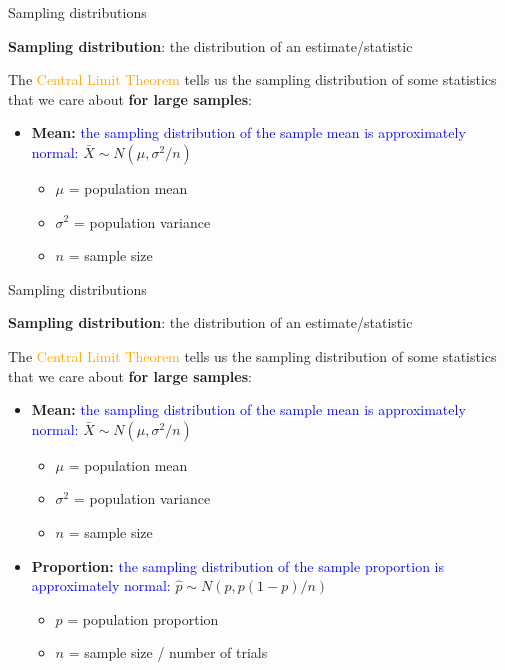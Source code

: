 \documentclass[10pt,t]{beamer}
\begin{document}
\begin{frame}{Sampling distributions}

\textbf{Sampling distribution}: the distribution of an estimate/statistic

\vspace{0.3cm}

The \textcolor{orange}{Central Limit Theorem} tells us the sampling distribution of some statistics that we care about \textbf{for large samples}:
\medskip
\begin{itemize}
		\item \textbf{Mean:} \textcolor{blue}{the sampling distribution of the sample mean is approximately normal:} $\bar{X} \sim N(\mu, \sigma^2 / n)$
	\smallskip
	\begin{itemize}
		\item $\mu$ = population mean
		\smallskip
		\item $\sigma^2$ = population variance
		\smallskip
		\item $n$ = sample size
	\end{itemize}

\end{itemize}
\end{frame}

\begin{frame}{Sampling distributions}

\textbf{Sampling distribution}: the distribution of an estimate/statistic

\vspace{0.3cm}

The \textcolor{orange}{Central Limit Theorem} tells us the sampling distribution of some statistics that we care about \textbf{for large samples}:
\medskip
\begin{itemize}
	\item \textbf{Mean:} \textcolor{blue}{the sampling distribution of the sample mean is approximately normal:} $\bar{X} \sim N(\mu, \sigma^2 / n)$
	\smallskip
	\begin{itemize}
		\item $\mu$ = population mean
		\smallskip
		\item $\sigma^2$ = population variance
		\smallskip
		\item $n$ = sample size
	\end{itemize}
\medskip
	\item \textbf{Proportion:} \textcolor{blue}{the sampling distribution of the sample proportion is approximately normal:} $ \hat{p} \sim N(p, p(1-p)/n)$
	\begin{itemize}
		\smallskip
		\item $p$ = population proportion
		\smallskip
		\item $n$ = sample size / number of trials
	\end{itemize}
\end{itemize}
\end{frame}
\end{document}
